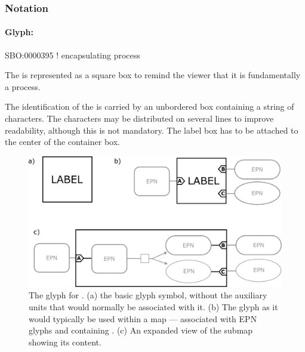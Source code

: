 
\subsubsection{Notation}

\paragraph{Glyph: }

\begin{glyphDescription}

\glyphSboTerm SBO:0000395 ! encapsulating process

\glyphContainer The  is represented as a square box to remind the viewer that it is fundamentally a process.

\glyphLabel The identification of the  is carried by an unbordered box containing a string of characters.  The characters may be distributed on several lines to improve readability, although this is not mandatory.  The label box has to be attached to the center of the container box.

\end{glyphDescription}


\begin{figure}[htb]
  \centering
  \includegraphics[scale = 0.22]{images/submapglyph}
  \caption{The \PD glyph for . (a) the basic glyph
    symbol, without the  auxiliary units that
    would normally be associated with it. (b) The glyph as it would
    typically be used within a map --- associated with EPN glyphs and
    containing . (c) An expanded view of the
    submap showing its content.}
  \label{fig:techref:submap}
\end{figure}

